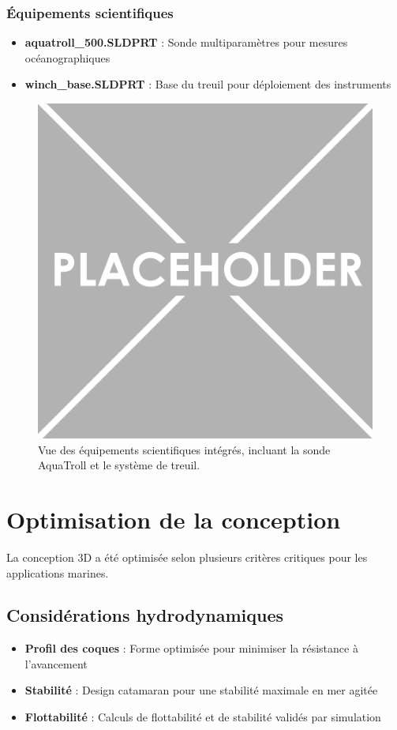 {\subsubsection{Équipements scientifiques}
\begin{itemize}
    \setlength{\itemsep}{.375em}
    \item \textbf{aquatroll\_500.SLDPRT} : Sonde multiparamètres pour mesures océanographiques
    \item \textbf{winch\_base.SLDPRT} : Base du treuil pour déploiement des instruments
\end{itemize}

\begin{figure}[!htpb]
    \centering
    \includegraphics[width=0.7\linewidth]{Figures/PezizaTuberosa.jpg}
    \caption[Équipements scientifiques]{Vue des équipements scientifiques intégrés, incluant la sonde AquaTroll et le système de treuil.}
    \label{fig:equipements-scientifiques}
\end{figure}

\section{Optimisation de la conception}
La conception 3D a été optimisée selon plusieurs critères critiques pour les applications marines.

\subsection{Considérations hydrodynamiques}
\begin{itemize}
    \setlength{\itemsep}{.375em}
    \item \textbf{Profil des coques} : Forme optimisée pour minimiser la résistance à l'avancement
    \item \textbf{Stabilité} : Design catamaran pour une stabilité maximale en mer agitée
    \item \textbf{Flottabilité} : Calculs de flottabilité et de stabilité validés par simulation
\end{itemize}

}

